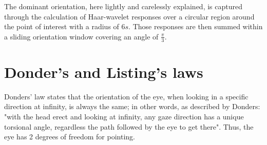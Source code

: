 The dominant orientation, here lightly and carelessly explained, is captured through the calculation of Haar-wavelet responses over a circular region around the point of interest with a radius of 6$s$. Those responses are then summed within a sliding orientation window covering an angle of $\frac{\pi}{3}$. \cite{surf} \cite{compsiftsurf}

\section{Donder's and Listing's laws}
\label{appendix:cha1:listings}

Donders' law states that the orientation of the eye, when looking in a specific direction at infinity, is always the same; in other words, as described by Donders: "with the head erect and looking at infinity, any gaze direction has a unique torsional angle, regardless the path followed by the eye to get there". Thus, the eye has 2 degrees of freedom for pointing.

